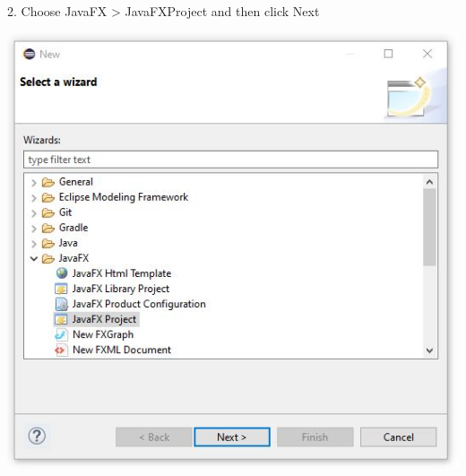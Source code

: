 \documentclass{beamer}
\begin{document}
\begin{frame}

        2.  Choose JavaFX > JavaFXProject and then click Next

        \begin{center}
            \includegraphics[scale=.4]{java_fx_project.jpg}
        \end{center}
        
\end{frame}
\end{document}
